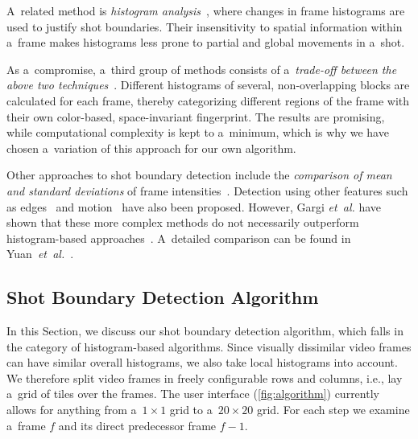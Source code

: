 A~related method is
\emph{histogram analysis}~\cite{otoole1999shotboundary},
where changes in frame histograms are used
to justify shot boundaries.
Their insensitivity to spatial information
within a~frame makes histograms less prone to partial
and global movements in a~shot.

As a~compromise, a~third group of methods consists of
a~\emph{trade-off between the above two
techniques}~\cite{ahmed1999keyframe}.
Different histograms of several, non-overlapping blocks
are calculated for each frame,
thereby categorizing different regions of the frame
with their own color-based, space-invariant fingerprint.
The results are promising, while computational complexity
is kept to a~minimum, which is why we have chosen
a~variation of this approach for our own algorithm.

Other approaches to shot boundary detection include
the \emph{comparison of mean and standard deviations}
of frame intensities~\cite{lienhart1999comparison}.
Detection using other features such as
edges~\cite{zabih1995scenebreaks} and
motion~\cite{bouthemy1997shotchange} have also been proposed.
However, Gargi \emph{et~al.} have shown that
these more complex methods do not necessarily
outperform histogram-based approaches~\cite{gargi2000videoshot}.
A~detailed comparison can be found in
Yuan~\emph{et~al.}~\cite{yuan2007shotboundary}.

\subsection{Shot Boundary Detection Algorithm} \label{sec:details-of-algo}
In this Section, we discuss our shot boundary detection algorithm, which falls in the category of histogram-based algorithms.  Since visually dissimilar video frames can have similar overall histograms, we also take local histograms into account. 
We therefore split video frames in freely configurable rows and columns, i.e., lay a~grid of tiles over the frames. The user interface (\autoref{fig:algorithm}) currently allows for anything from a~$\mathit{1} \times \mathit{1}$ grid to a~$\mathit{20} \times \mathit{20}$ grid. For each step we examine a~frame $\mathit{f}$ and its direct predecessor frame $\mathit{f - 1}$.

